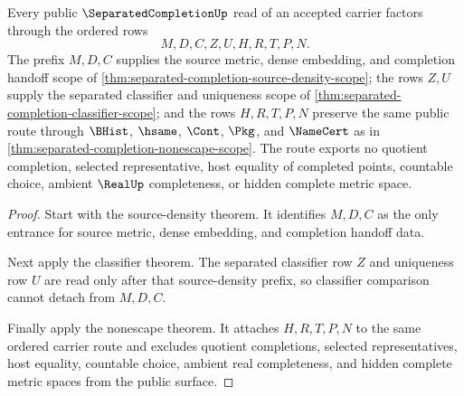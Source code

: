 \begin{theorem}
\label{thm:separatedcompletion-scope-closure-route}
Every public $\SeparatedCompletionUp$ read of an accepted carrier factors through the ordered rows
$$
M,D,C,Z,U,H,R,T,P,N .
$$
The prefix $M,D,C$ supplies the source metric, dense embedding, and completion handoff scope of \autoref{thm:separated-completion-source-density-scope}; the rows $Z,U$ supply the separated classifier and uniqueness scope of \autoref{thm:separated-completion-classifier-scope}; and the rows $H,R,T,P,N$ preserve the same public route through $\BHist$, $\hsame$, $\Cont$, $\Pkg$, and $\NameCert$ as in \autoref{thm:separated-completion-nonescape-scope}. The route exports no quotient completion, selected representative, host equality of completed points, countable choice, ambient $\RealUp$ completeness, or hidden complete metric space.
\end{theorem}
\begin{proof}
Start with the source-density theorem. It identifies $M,D,C$ as the only entrance for source metric, dense embedding, and completion handoff data.

Next apply the classifier theorem. The separated classifier row $Z$ and uniqueness row $U$ are read only after that source-density prefix, so classifier comparison cannot detach from $M,D,C$.

Finally apply the nonescape theorem. It attaches $H,R,T,P,N$ to the same ordered carrier route and excludes quotient completions, selected representatives, host equality, countable choice, ambient real completeness, and hidden complete metric spaces from the public surface.
\end{proof}
